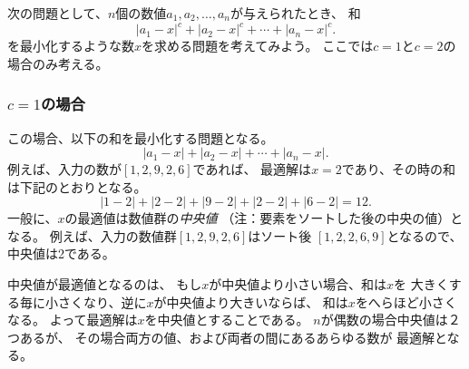 次の問題として、$n$個の数値$a_1,a_2,\ldots,a_n$が与えられたとき、
和\[|a_1-x|^c+|a_2-x|^c+\cdots+|a_n-x|^c.\]
を最小化するような数$x$を求める問題を考えてみよう。
ここでは$c=1$と$c=2$の場合のみ考える。

\begin{comment}
\subsubsection{Case $c=1$}

In this case, we should minimize the sum
\[|a_1-x|+|a_2-x|+\cdots+|a_n-x|.\]
For example, if the numbers are $[1,2,9,2,6]$,
the best solution is to select $x=2$
which produces the sum
\[
|1-2|+|2-2|+|9-2|+|2-2|+|6-2|=12.
\]
In the general case, the best choice for $x$
is the \textit{median} of the numbers,
i.e., the middle number after sorting.
For example, the list $[1,2,9,2,6]$
becomes $[1,2,2,6,9]$ after sorting,
so the median is 2.
\end{comment}

\subsubsection{$c=1$の場合}

この場合、以下の和を最小化する問題となる。
\[|a_1-x|+|a_2-x|+\cdots+|a_n-x|.\]
例えば、入力の数が$[1,2,9,2,6]$であれば、
最適解は$x=2$であり、その時の和は下記のとおりとなる。
\[
|1-2|+|2-2|+|9-2|+|2-2|+|6-2|=12.
\]
一般に、$x$の最適値は数値群の\textit{中央値}
（注：要素をソートした後の中央の値）となる。
例えば、入力の数値群$[1,2,9,2,6]$はソート後
$[1,2,2,6,9]$となるので、中央値は2である。

\begin{comment}
The median is an optimal choice,
because if $x$ is smaller than the median,
the sum becomes smaller by increasing $x$,
and if $x$ is larger then the median,
the sum becomes smaller by decreasing $x$.
Hence, the optimal solution is that $x$
is the median.
If $n$ is even and there are two medians,
both medians and all values between them
are optimal choices.
\end{comment}

中央値が最適値となるのは、
もし$x$が中央値より小さい場合、和は$x$を
大きくする毎に小さくなり、逆に$x$が中央値より大きいならば、
和は$x$をへらほど小さくなる。
よって最適解は$x$を中央値とすることである。
$n$が偶数の場合中央値は２つあるが、
その場合両方の値、および両者の間にあるあらゆる数が
最適解となる。

